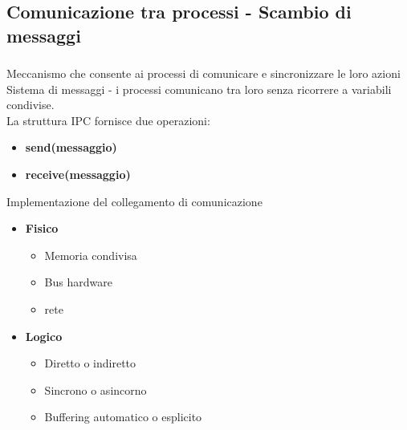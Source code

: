 \documentclass{beamer}
\newenvironment{mainframe}{
	\begin{frame}
		\frametitle{\insertsubsection}
		\framesubtitle{\insertsection}
	}{
	\end{frame}
}
\begin{document}
\subsection{Comunicazione tra processi - Scambio di messaggi}
\begin{mainframe}
	Meccanismo che consente ai processi di comunicare e sincronizzare le loro azioni\\
	Sistema di messaggi - i processi comunicano tra loro senza ricorrere a variabili condivise.\\
	La struttura IPC fornisce due operazioni:
	\begin{itemize}
		\item \textbf{send(messaggio)}
		\item \textbf{receive(messaggio)}
	\end{itemize}
\end{mainframe}
\begin{frame}
	Implementazione del collegamento di comunicazione
	\begin{itemize}
		\item \textbf{Fisico}
		\begin{itemize}
			\item Memoria condivisa
			\item Bus hardware
			\item rete
		\end{itemize}
		\item \textbf{Logico}
		\begin{itemize}
			\item Diretto o indiretto
			\item Sincrono o asincorno
			\item Buffering automatico o esplicito
		\end{itemize}
	\end{itemize}
\end{frame}
\end{document}
